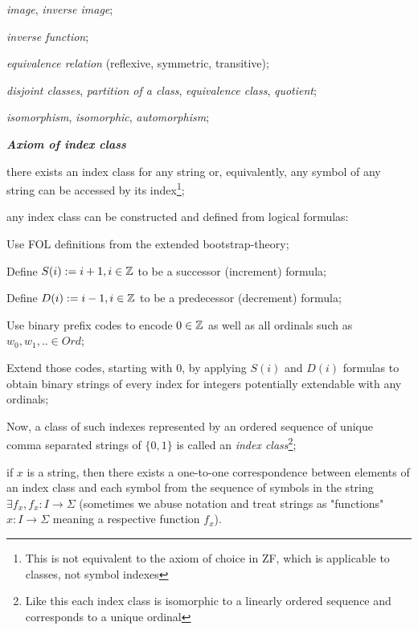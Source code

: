 \begin{definition}
\begin{legal}
\begin{legal}
\begin{legal}
\begin{legal}
            \item \textit{image}, \textit{inverse image};
            \item \textit{inverse function};
            \item \textit{equivalence relation} (reflexive, symmetric, transitive);
            \item \textit{disjoint classes}, \textit{partition of a class}, \textit{equivalence class}, \textit{quotient};
            \item \textit{isomorphism}, \textit{isomorphic}, \textit{automorphism};
          \end{legal}
      \end{legal}
    \end{legal}
    \item \textbf{\textit{Axiom of index class}}
    \begin{legal}
      \item there exists an index class for any string or, equivalently, any symbol of any string can be accessed by its index\footnote{This is not equivalent to the axiom of choice in ZF, which is applicable to classes, not symbol indexes};
      \item any index class can be constructed and defined from logical formulas:
      \begin{legal}
        \item Use FOL definitions from the extended bootstrap-theory;
        \item Define $S(i) := i + 1, i \in \mathbb{Z}$ to be a successor (increment) formula;
        \item Define $D(i) := i - 1, i \in \mathbb{Z}$ to be a predecessor (decrement) formula;
        \item Use binary prefix codes to encode $0 \in \mathbb{Z}$ as well as all ordinals such as $w_0, w_1,.. \in Ord$;
        \item Extend those codes, starting with $0$, by applying $S(i)$ and $D(i)$ formulas to obtain binary strings of every index for integers potentially extendable with any ordinals;
        \item Now, a class of such indexes represented by an ordered sequence of unique comma separated strings of $\{0,1\}$ is called an \textit{index class}\footnote{Like this each index class is isomorphic to a linearly ordered sequence and corresponds to a unique ordinal};
      \end{legal}
      \item if $x$ is a string, then there exists a one-to-one correspondence between elements of an index class and each symbol from the sequence of symbols in the string $\exists f_x, f_x: I \to \Sigma$ (sometimes we abuse notation and treat strings as "functions" $x: I \to \Sigma$ meaning a respective function $f_x$).

\end{legal}
\end{legal}
\end{definition}
